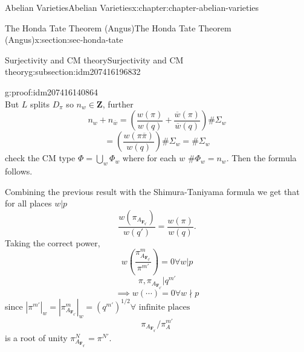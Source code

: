 \documentclass[oneside,10pt,]{book}
\numberwithin{equation}{section}
\newcommand{\ZZ}{\mathbf{Z}}
\newcommand{\FF}{\mathbf{F}}
\begin{document}
\begin{chapterptx}{Abelian Varieties}{}{Abelian Varieties}{}{}{x:chapter:chapter-abelian-varieties}
\begin{sectionptx}{The Honda Tate Theorem (Angus)}{}{The Honda Tate Theorem (Angus)}{}{}{x:section:sec-honda-tate}
\begin{subsectionptx}{Surjectivity and CM theory}{}{Surjectivity and CM theory}{}{}{g:subsection:idm207416196832}
\begin{proofptx}{}{g:proof:idm207416140864}
\begin{equation*}
\end{equation*}
But \(L\) splits \(D_\pi\) so \(n_w \in \ZZ\), further%
\begin{equation*}
n_w + n_{\overline w} = \left( \frac{w(\pi)}{w(q)}  + \frac{\overline w(\pi)}{\overline w(q)} \right) \#\Sigma_w
\end{equation*}
%
\begin{equation*}
= \left( \frac{w(\pi\overline \pi)}{w(q)} \right) \#\Sigma_w = \#\Sigma_w
\end{equation*}
check the CM type \(\Phi = \bigcup_w \Phi_w\) where for each \(w\) \(\# \Phi_w = n_w\). Then the formula follows.%
\end{proofptx}
Combining the previous result with the Shimura-Taniyama formula we get that for all places \(w|p\)%
\begin{equation*}
\frac{w(\pi_{A_{\FF_{q'}}})}{w(q')} = \frac{w(\pi)}{w(q)}\text{.}
\end{equation*}
Taking the correct power,%
\begin{equation*}
w\left( \frac {\pi^m_{A_{\FF_{q'}}}}{\pi^{m'}}\right) = 0 \forall w|p
\end{equation*}
%
\begin{equation*}
\pi,\pi_{A_{\FF_{q'}}}|q^{m'}
\end{equation*}
%
\begin{equation*}
\implies w(\cdots) = 0 \forall w \nmid p
\end{equation*}
since \(|\pi^{m'}|_w = |\pi_{A_{\FF_{q'}}}^m|_w = (q^{m'})^{1/2} \forall \text{ infinite places}\)%
\begin{equation*}
\pi_{A_{\FF_{q'}}}/ \pi_A^{m'}
\end{equation*}
is a root of unity \(\pi^N_{A_{\FF_{q'}}} = \pi^{N'}\).%
\end{subsectionptx}
\end{sectionptx}
\end{chapterptx}
%
%
\typeout{************************************************}
\typeout{************************************************}
%
\end{document}
